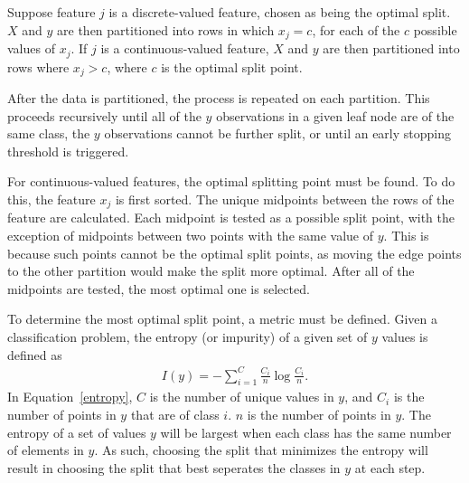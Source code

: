 \documentclass{amsart}
\begin{document}
    Suppose feature $j$ is a discrete-valued feature, chosen as being the optimal split.
    $X$ and $y$ are then partitioned into rows in which $x_j = c$, for each of the $c$ possible values of
    $x_j$. If $j$ is a continuous-valued feature, $X$ and $y$ are then partitioned into rows
    where $x_j > c$, where $c$ is the optimal split point.

    After the data is partitioned, the process is repeated on each partition. This proceeds recursively
    until all of the $y$ observations in a given leaf node are of the same class, the $y$
    observations cannot be further split, or until an early stopping threshold is triggered.

    For continuous-valued features, the optimal splitting point must be found.
    To do this, the feature $x_j$ is first sorted. The unique midpoints between the
    rows of the feature are calculated. Each midpoint is tested as a possible split point,
    with the exception of midpoints between two points with the same value of $y$. This
    is because such points cannot be the optimal split points, as moving the edge points
    to the other partition would make the split more optimal. After all of the midpoints are tested,
    the most optimal one is selected.

    To determine the most optimal split point, a metric must be defined. Given a classification
    problem, the entropy (or impurity) of a given set of $y$ values is defined as
    \begin{align}
        I(y) = -\sum_{i=1}^{C} \frac{C_i}{n} \log \frac{C_i}{n}.
    \label{entropy}
    \end{align}
    In Equation~\ref{entropy}, $C$ is the number of unique values in $y$, and $C_i$ is the number
    of points in $y$ that are of class $i$. $n$ is the number of points in $y$. The entropy of a
    set of values $y$ will be largest when each class has the same number of elements in $y$.
    As such, choosing the split that minimizes the entropy will result in choosing the split
    that best seperates the classes in $y$ at each step.
\end{document}

